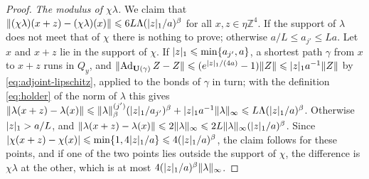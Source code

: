 \documentclass[11pt]{preprint}
\newcommand{\Ad}{\operatorname{Ad}}
\DeclarePairedDelimiter{\abs}{\lvert}{\rvert}
\DeclarePairedDelimiter{\norm}{\lVert}{\rVert}
\numberwithin{equation}{section}
\begin{document}
\begin{proof}
\emph{The modulus of $\chi\lambda$.} We claim that $\norm{(\chi\lambda)(x + z) - (\chi\lambda)(x)} \leqslant 6L\Lambda(\abs z_1/a)^\beta$ for all $x, z \in \eta\mathbb Z^4$. If the support of $\lambda$ does not meet that of $\chi$ there is nothing to prove; otherwise $a/L \leqslant a_{j'} \leqslant La$. Let $x$ and $x + z$ lie in the support of $\chi$. If $\abs z_1 \leqslant \min\{ a_{j'}, a \}$, a shortest path $\gamma$ from $x$ to $x + z$ runs in $Q_y$, and $\norm{\Ad_{\mathbf U(\gamma)}Z - Z} \leqslant (e^{\abs z_1/(4a)} - 1)\norm Z \leqslant \abs z_1a^{-1}\norm Z$ by \eqref{eq:adjoint-lipschitz}, applied to the bonds of $\gamma$ in turn; with the definition \eqref{eq:holder} of the norm of $\lambda$ this gives $\norm{\lambda(x + z) - \lambda(x)} \leqslant \norm\lambda^{(j')}_\beta(\abs z_1/a_{j'})^\beta + \abs z_1a^{-1}\norm\lambda_\infty \leqslant L\Lambda(\abs z_1/a)^\beta$. Otherwise $\abs z_1 > a/L$, and $\norm{\lambda(x + z) - \lambda(x)} \leqslant 2\norm\lambda_\infty \leqslant 2L\norm\lambda_\infty(\abs z_1/a)^\beta$. Since $\abs{\chi(x + z) - \chi(x)} \leqslant \min\{ 1, 4\abs z_1/a \} \leqslant 4(\abs z_1/a)^\beta$, the claim follows for these points, and if one of the two points lies outside the support of $\chi$, the difference is $\chi\lambda$ at the other, which is at most $4(\abs z_1/a)^\beta\norm\lambda_\infty$.


\end{proof}
\end{document}
